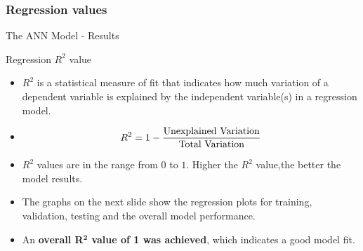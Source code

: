 \documentclass{beamer}
\begin{document}
\subsubsection{Regression values}
\begin{frame}{The ANN Model - Results}
    \begin{block}{Regression $R^2$ value}
        \begin{itemize}
            \justifying
            \item $R^2$ is a statistical measure of fit that indicates how much variation of a dependent variable is explained by the independent variable(s) in a regression model.
            \item \; \vspace{-6mm} \begin{align*}
                R^2 = 1 - \dfrac{\text{Unexplained Variation}}{\text{Total Variation}}\vspace{-4mm}
            \end{align*}
            \item $R^2$ values are in the range from $0$ to $1$. Higher the $R^2$ value,the better the model results.
            \item The graphs on the next slide show the regression plots for training, validation, testing and the overall model performance.
            \item  An \textbf{overall R$^{\textbf{2}}$ value of 1 was achieved}, which indicates a good model fit.
        \end{itemize}
    \end{block}
\end{frame}
\end{document}
